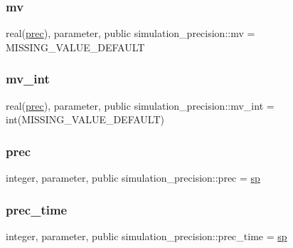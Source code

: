 \subsubsection{\texorpdfstring{mv}{mv}}
{\footnotesize\ttfamily real(\mbox{\hyperlink{namespacesimulation__precision_a6d3bcd3b4ff2cfb92ec9fe36ecad405b}{prec}}), parameter, public simulation\+\_\+precision\+::mv = M\+I\+S\+S\+I\+N\+G\+\_\+\+V\+A\+L\+U\+E\+\_\+\+D\+E\+F\+A\+U\+LT}

\mbox{\label{namespacesimulation__precision_ae23a853ee1499839ea702b3c01e443fc}} 
\subsubsection{\texorpdfstring{mv\+\_\+int}{mv\_int}}
{\footnotesize\ttfamily real(\mbox{\hyperlink{namespacesimulation__precision_a6d3bcd3b4ff2cfb92ec9fe36ecad405b}{prec}}), parameter, public simulation\+\_\+precision\+::mv\+\_\+int = int(M\+I\+S\+S\+I\+N\+G\+\_\+\+V\+A\+L\+U\+E\+\_\+\+D\+E\+F\+A\+U\+LT)}

\mbox{\label{namespacesimulation__precision_a6d3bcd3b4ff2cfb92ec9fe36ecad405b}} 
\subsubsection{\texorpdfstring{prec}{prec}}
{\footnotesize\ttfamily integer, parameter, public simulation\+\_\+precision\+::prec = \mbox{\hyperlink{namespacesimulation__precision_a3657003647318cfe37c797ab37448a2e}{sp}}}

\mbox{\label{namespacesimulation__precision_a09a1db15abeed81ff2f54b363128ffed}} 
\subsubsection{\texorpdfstring{prec\+\_\+time}{prec\_time}}
{\footnotesize\ttfamily integer, parameter, public simulation\+\_\+precision\+::prec\+\_\+time = \mbox{\hyperlink{namespacesimulation__precision_a3657003647318cfe37c797ab37448a2e}{sp}}}

